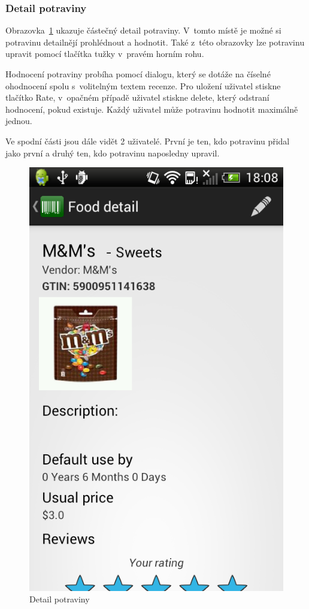 \documentclass[thesis=B,czech]{FITthesis}[2013/10/20]
\begin{document}
\clearpage

\subsubsection{Detail potraviny}

Obrazovka~\ref{fig:AppFoodDetail} ukazuje částečný detail potraviny. V~tomto místě je možné si potravinu detailnějí prohlédnout a hodnotit. Také z~této obrazovky lze potravinu upravit pomocí tlačítka tužky v~pravém horním rohu.

Hodnocení potraviny probíha pomocí dialogu, který se dotáže na číselné ohodnocení spolu s~volitelným textem recenze. Pro uložení uživatel stiskne tlačítko Rate, v~opačném případě uživatel stiskne delete, který odstraní hodnocení, pokud existuje. Každý uživatel může potravinu hodnotit maximálně jednou.

Ve spodní části jsou dále vidět 2 uživatelé. První je ten, kdo potravinu přidal jako první a druhý ten, kdo potravinu naposledny upravil.

\begin{figure}[H]
  \centering
  \includegraphics[scale=0.4]{screenshots/app_food_detail.png}
  \caption{Detail potraviny}
  \label{fig:AppFoodDetail}
\end{figure}
\end{document}
